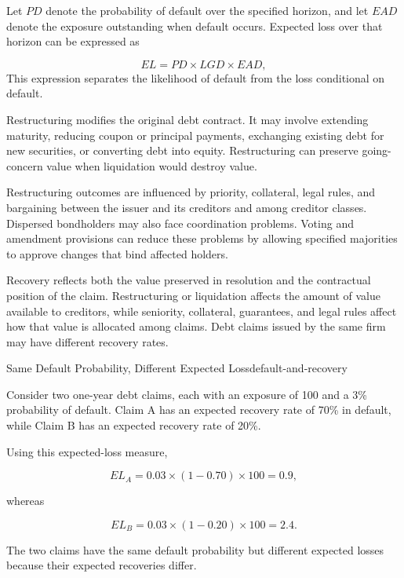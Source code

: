 Let $PD$ denote the probability of default over the specified horizon, and let $EAD$ denote the exposure outstanding when default occurs. Expected loss over that horizon can be expressed as

\begin{equation}
EL=PD\times LGD\times EAD,
\label{eq:ch8-expected-credit-loss}
\end{equation}
This expression separates the likelihood of default from the loss conditional on default.

Restructuring modifies the original debt contract. It may involve extending maturity, reducing coupon or principal payments, exchanging existing debt for new securities, or converting debt into equity. Restructuring can preserve going-concern value when liquidation would destroy value.

Restructuring outcomes are influenced by priority, collateral, legal rules, and bargaining between the issuer and its creditors and among creditor classes. Dispersed bondholders may also face coordination problems. Voting and amendment provisions can reduce these problems by allowing specified majorities to approve changes that bind affected holders.

Recovery reflects both the value preserved in resolution and the contractual position of the claim. Restructuring or liquidation affects the amount of value available to creditors, while seniority, collateral, guarantees, and legal rules affect how that value is allocated among claims. Debt claims issued by the same firm may have different recovery rates.

\begin{example}{Same Default Probability, Different Expected Loss}{default-and-recovery}

Consider two one-year debt claims, each with an exposure of 100 and a 3\% probability of default. Claim A has an expected recovery rate of 70\% in default, while Claim B has an expected recovery rate of 20\%.

Using this expected-loss measure,

\[
EL_A=0.03\times(1-0.70)\times100=0.9,
\]

whereas

\[
EL_B=0.03\times(1-0.20)\times100=2.4.
\]

The two claims have the same default probability but different expected losses because their expected recoveries differ.

\end{example}

